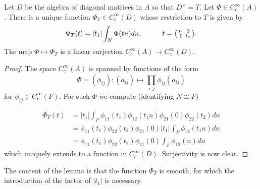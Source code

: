 \begin{lemma}\label{lemma:phiT}
    Let $D$ be the algebra of diagonal matrices in $A$ so that $D^\times =T$. Let $\Phi \in C_c^\infty(A)$. There is a unique function $\Phi_T \in C_c^\infty(D)$ whose restriction to $T$ is given by 
    $$\Phi_T(t) = |t_1| \int_N \Phi(tn)dn, \hspace{1cm} t=\begin{psmallmatrix}
        t_1 & 0\\0&t_2
    \end{psmallmatrix}.$$
    The map $\Phi \mapsto \Phi_T$ is a linear surjection $C_c^\infty(A) \to C_c^\infty (D)$.
\end{lemma}
\begin{proof}
    The space $C_c^\infty(A)$ is spanned by functions of the form 
    $$\Phi = (\phi_{ij}): (a_{ij}) \mapsto \prod\limits_{i,j} \phi_{ij}(a_{ij})$$
    for $\phi_{ij} \in C_c^\infty (F)$. For such $\Phi$ we compute (identifying $N \cong F$)
    
    \begin{equation*}
        \begin{split}
            \Phi_T(t) &= |t_1| \int_F \phi_{11}(t_1)\phi_{12}(t_1n)\phi_{21}(0)\phi_{22}(t_2)dn \\
            &= \phi_{11}(t_1)\phi_{22}(t_2)\phi_{21}(0) |t_1|\int_F \phi_{12}(t_1n) dn \\
            &= \phi_{11}(t_1)\phi_{22}(t_2)\phi_{21}(0) \int_F \phi_{12}(n) dn
        \end{split}
    \end{equation*}
    which uniquely extends to a function in $C_c^\infty(D)$. Surjectivity is now clear.
\end{proof}
\begin{rem}
    The content of the lemma is that the function $\Phi_T$ is smooth, for which the introduction of the factor of $|t_1|$ is necessary.
\end{rem}

